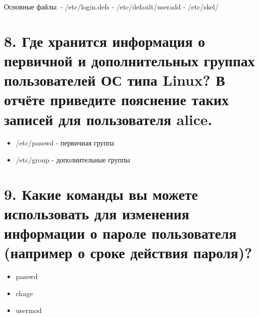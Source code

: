 \documentclass[
  12pt,
  a4paper,
  DIV=11,
  numbers=noendperiod]{scrreprt}
\providecommand{\tightlist}{%
  \setlength{\itemsep}{0pt}\setlength{\parskip}{0pt}}\usepackage{longtable,booktabs,array}
\begin{document}
Основные файлы: - /etc/login.defs - /etc/default/useradd - /etc/skel/

\section{8. Где хранится информация о первичной и дополнительных группах
пользователей ОС типа Linux? В отчёте приведите пояснение таких записей
для пользователя
alice.}\label{ux433ux434ux435-ux445ux440ux430ux43dux438ux442ux441ux44f-ux438ux43dux444ux43eux440ux43cux430ux446ux438ux44f-ux43e-ux43fux435ux440ux432ux438ux447ux43dux43eux439-ux438-ux434ux43eux43fux43eux43bux43dux438ux442ux435ux43bux44cux43dux44bux445-ux433ux440ux443ux43fux43fux430ux445-ux43fux43eux43bux44cux437ux43eux432ux430ux442ux435ux43bux435ux439-ux43eux441-ux442ux438ux43fux430-linux-ux432-ux43eux442ux447ux451ux442ux435-ux43fux440ux438ux432ux435ux434ux438ux442ux435-ux43fux43eux44fux441ux43dux435ux43dux438ux435-ux442ux430ux43aux438ux445-ux437ux430ux43fux438ux441ux435ux439-ux434ux43bux44f-ux43fux43eux43bux44cux437ux43eux432ux430ux442ux435ux43bux44f-alice.}

\begin{itemize}
\tightlist
\item
  /etc/passwd - первичная группа
\item
  /etc/group - дополнительные группы
\end{itemize}

\section{9. Какие команды вы можете использовать для изменения
информации о пароле пользователя (например о сроке действия
пароля)?}\label{ux43aux430ux43aux438ux435-ux43aux43eux43cux430ux43dux434ux44b-ux432ux44b-ux43cux43eux436ux435ux442ux435-ux438ux441ux43fux43eux43bux44cux437ux43eux432ux430ux442ux44c-ux434ux43bux44f-ux438ux437ux43cux435ux43dux435ux43dux438ux44f-ux438ux43dux444ux43eux440ux43cux430ux446ux438ux438-ux43e-ux43fux430ux440ux43eux43bux435-ux43fux43eux43bux44cux437ux43eux432ux430ux442ux435ux43bux44f-ux43dux430ux43fux440ux438ux43cux435ux440-ux43e-ux441ux440ux43eux43aux435-ux434ux435ux439ux441ux442ux432ux438ux44f-ux43fux430ux440ux43eux43bux44f}

\begin{itemize}
\tightlist
\item
  passwd
\item
  chage
\item
  usermod
\end{itemize}
\end{document}
